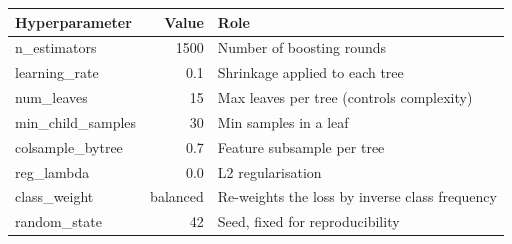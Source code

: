 \begin{tabular}{l r l}
\hline
\textbf{Hyperparameter} & \textbf{Value} & \textbf{Role} \\
\hline
n\_estimators & 1500 & Number of boosting rounds \\
learning\_rate & 0.1 & Shrinkage applied to each tree \\
num\_leaves & 15 & Max leaves per tree (controls complexity) \\
min\_child\_samples & 30 & Min samples in a leaf \\
colsample\_bytree & 0.7 & Feature subsample per tree \\
reg\_lambda & 0.0 & L2 regularisation \\
class\_weight & balanced & Re-weights the loss by inverse class frequency \\
random\_state & 42 & Seed, fixed for reproducibility \\
\hline
\end{tabular}